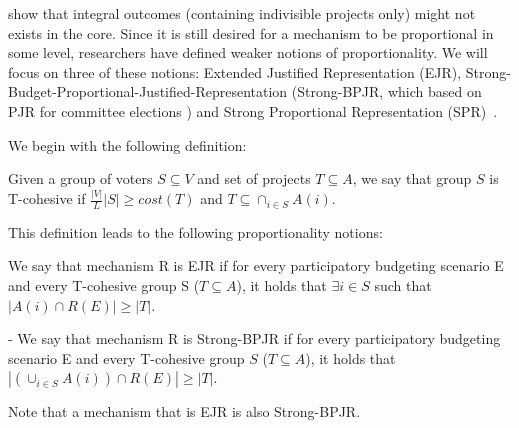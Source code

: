 \documentclass[runningheads]{llncs}
\newcommand{\kibitz}[2]{\ifnum\Comments=1{\color{#1}{#2}}\fi}
\newcommand{\rf}[1]{\kibitz{blue}{[Roy says:#1]}}
\begin{document}


\citet{fain2018fair} show that integral outcomes (containing indivisible projects only) might not exists in the core.
Since it is still desired for a mechanism to be proportional in some level, researchers have   defined  weaker notions of proportionality. We will focus on three of these notions: Extended Justified Representation (EJR)\cite{peters2020proportional}, Strong-Budget-Proportional-Justified-Representation \cite{aziz2017proportionally} (Strong-BPJR, which based on PJR for committee elections \cite{aziz2017justified,sanchez2016proportional}) and Strong Proportional Representation (SPR)~\cite{skowron2020participatory}.

We begin with the following definition:
\begin{definition} Given a group of voters $S\subseteq V$ and set of projects $T\subseteq A$, we say that group $S$ is T-cohesive if $\frac{|V|}{L}|S|\geq cost(T)$ and $T\subseteq \cap_{i\in S}A(i)$.
\end{definition}

This definition leads to the following proportionality notions:
\begin{definition}  We say that mechanism R is EJR if for every participatory budgeting scenario E and every T-cohesive group S ($T\subseteq A$), it holds that $\exists i\in S $ such that $|A(i)\cap R(E)|\geq |T|$.
\end{definition}

\begin{definition}
 - We say that mechanism R is Strong-BPJR if for every participatory budgeting scenario E and every T-cohesive group $S$ ($T\subseteq A$), it holds that  $|(\cup_{i\in S}A(i))\cap R(E)|\geq |T|$. 
\end{definition}
Note  that a mechanism that is  EJR is also Strong-BPJR. 
\end{document}
